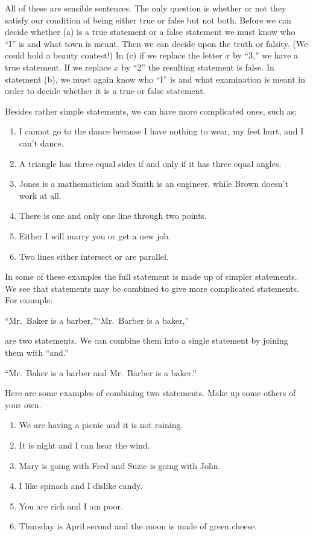 \documentclass[11pt]{book}
\theoremstyle{bkplain}
\theoremstyle{XIplainnote}
\theoremstyle{bkplain}
\theoremstyle{bkplain}
\begin{document}
All of these are sensible sentences. The only question is whether or not they
satisfy our condition of being either true or false but not both. Before we can
decide whether (a) is a true statement or a false statement we must know who
``I'' is and what town is meant. Then we can decide upon the truth or falsity.
(We could hold a beauty contest!) In (c) if we replace the letter $x$ by ``3,''
we have a true statement. If we replace $x$ by ``2'' the resulting statement is
false. In statement (b), we must again know who ``I'' is and what examination is
meant in order to decide whether it is a true or false statement.

Besides rather simple statements, we can have more complicated ones, such as:

\begin{enumerate}[label=(\alph*), leftmargin=2.2em, itemsep=1pt, topsep=3pt]
\item I cannot go to the dance because I have nothing to wear, my feet hurt, and
      I can't dance.
\item A triangle has three equal sides if and only if it has three equal angles.
\item Jones is a mathematician and Smith is an engineer, while Brown doesn't work
      at all.
\item There is one and only one line through two points.
\item Either I will marry you or get a new job.
\item Two lines either intersect or are parallel.
\end{enumerate}

In some of these examples the full statement is made up of simpler statements. We
see that statements may be combined to give more complicated statements. For
example:

\begin{center}
``Mr.\ Baker is a barber,''\qquad ``Mr.\ Barber is a baker,''
\end{center}

\noindent are two statements. We can combine them into a single statement by
joining them with ``and.''

\begin{center}
``Mr.\ Baker is a barber and Mr.\ Barber is a baker.''
\end{center}

Here are some examples of combining two statements. Make up some others of your
own.

\begin{enumerate}[label=(\alph*), leftmargin=2.2em, itemsep=1pt, topsep=3pt]
\item We are having a picnic and it is not raining.
\item It is night and I can hear the wind.
\item Mary is going with Fred and Suzie is going with John.
\item I like spinach and I dislike candy.
\item You are rich and I am poor.
\item Thursday is April second and the moon is made of green cheese.
\end{enumerate}
\end{document}
